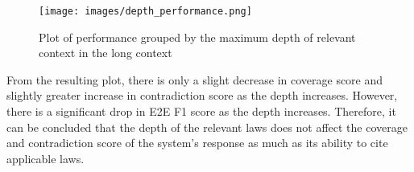 \begin{figure}[ht]
\centering
\texttt{[image: images/depth\_performance.png]}
\caption{Plot of performance grouped by the maximum depth of relevant context in the long context}
\label{fig: depth_performance}
\end{figure}

From the resulting plot, there is only a slight decrease in coverage score and slightly greater increase in contradiction score as the depth increases. However, there is a significant drop in E2E F1 score as the depth increases. Therefore, it can be concluded that the depth of the relevant laws does not affect the coverage and contradiction score of the system's response as much as its ability to cite applicable laws.  





